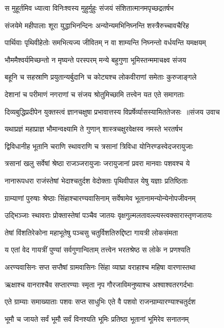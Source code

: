 \twolineshloka
{स मुहूर्तमिव ध्यात्वा विनिःश्वस्य मुहुर्मुहुः}
{संजयं संशितात्मानमपृच्छद्रतर्षभ}


\twolineshloka
{संजयेमे महीपालाः शूरा युद्धाभिनन्दिनः}
{अन्योन्यमभिनिघ्नन्ति शस्त्रैरुच्चावचैरिह}


\twolineshloka
{पार्थिवाः पृथिवीहेतोः समभित्यज्य जीवितम्}
{न वा शाम्यन्ति निघ्नन्तो वर्धयन्ति यमक्षयम्}


\twolineshloka
{भौममैश्वर्यमिच्छन्तो न मृष्यन्ते परस्परम्}
{मन्ये बहुगुणा भूमिस्तन्ममाचक्ष्व संजय}


\twolineshloka
{बहूनि च सहस्राणि प्रयुतान्यर्बुदानि च}
{कोट्यश्च लोकवीराणां समेताः कुरुजाङ्गले}


\twolineshloka
{देशानां च परीमाणं नगराणां च संजय}
{श्रोतुमिच्छामि तत्त्वेन यत एते समागताः}


\threelineshloka
{दिव्यबुद्धिप्रदीपेन युक्तस्त्वं ज्ञानचक्षुषा}
{प्रभावात्तस्य विप्रर्षेर्व्यासस्यामिततेजसः ॥संजय उवाच}
{}


\twolineshloka
{यथाप्रज्ञं महाप्राज्ञ भौमान्वक्ष्यामि ते गुणान्}
{शास्त्रचक्षुरवेक्षस्व नमस्ते भरतर्षभ}


\twolineshloka
{द्विविधानीह भूतानि चराणि स्थावराणि च}
{त्रसानां त्रिविधा योनिरण्डस्वेदजरायुजाः}


\twolineshloka
{त्रसानां खलु सर्वेषां श्रेष्ठा राजञ्जरायुजाः}
{जरायुजानां प्रवरा मानवाः पशवश्च ये}


\twolineshloka
{नानारूपधरा राजंस्तेषां भेदाश्चतुर्दश}
{वेदोक्ताः पृथिवीपाल येषु यज्ञाः प्रतिष्ठिताः}


\twolineshloka
{ग्राम्याणां पुरुषाः श्रेष्ठाः सिंहाश्चारण्यवासिनाम्}
{सर्वेषामेव भूतानामन्योन्येनोपजीवनम्}


\twolineshloka
{उद्भिञ्जाः स्थावराः प्रोक्तास्तेषां पञ्चैव जातयः}
{वृक्षगुल्मलतावल्ल्यस्त्वक्सारास्तृणजातयः}


\twolineshloka
{तेषां विंशतिरेकोना महाभूतेषु पञ्चसु}
{चतुर्विशतिरुद्दिष्टा गायत्री लोकसंमता}


\twolineshloka
{य एतां वेद गायत्रीं पुण्यां सर्वगुणान्विताम्}
{तत्त्वेन भरतश्रेष्ठ स लोके न प्रणश्यति}


\twolineshloka
{अरण्यवासिनः सप्त सप्तैषां ग्रामवासिनः}
{सिंहा व्याघ्रा वराहाश्च महिषा वारणास्तथा}


\twolineshloka
{ऋक्षाश्च वानराश्चैव सप्तारण्याः स्मृता नृप}
{गौरजाविमनुष्याश्च अश्वाश्वतरगर्दभाः}


\twolineshloka
{एते ग्राम्याः समाख्याताः पशवः सप्त साधुभिः}
{एते वै पशवो राजन्ग्राम्यारण्याश्चतुर्दश}


\twolineshloka
{भूमौ च जायते सर्वं भूमौ सर्वं विनश्यति}
{भूमिः प्रतिष्ठा भूतानां भूमिरेव सनातनम्}


